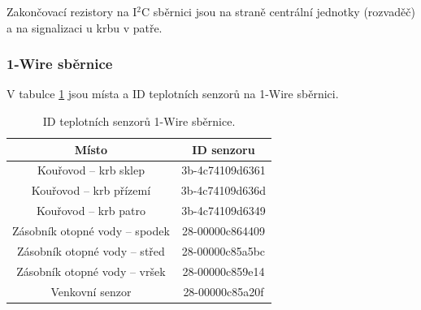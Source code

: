 Zakončovací rezistory na I$^2$C sběrnici jsou na straně centrální jednotky (rozvaděč) a na signalizaci u krbu v patře.


\begin{Czech}
\subsubsection{1-Wire sběrnice}
\end{Czech}

\begin{Czech}
V tabulce \ref{tab:1-wire-bus} jsou místa a ID teplotních senzorů na 1-Wire sběrnici.
\end{Czech}

\begin{table}[H]
\centering
\begin{tabular}{|c| c ||} 
 \hline
  Místo & ID senzoru \\ 
 \hline\hline
 Kouřovod – krb sklep & 3b-4c74109d6361 \\ 
 Kouřovod – krb přízemí & 3b-4c74109d636d \\ 
 Kouřovod – krb patro & 3b-4c74109d6349\\ 
 Zásobník otopné vody – spodek & 28-00000c864409 \\ 
 Zásobník otopné vody – střed & 28-00000c85a5bc \\ 
 Zásobník otopné vody – vršek & 28-00000c859e14 \\ 
 Venkovní senzor & 28-00000c85a20f \\ 
 \hline
\end{tabular}
\caption{ID teplotních senzorů 1-Wire sběrnice.}
\label{tab:1-wire-bus}
\end{table}